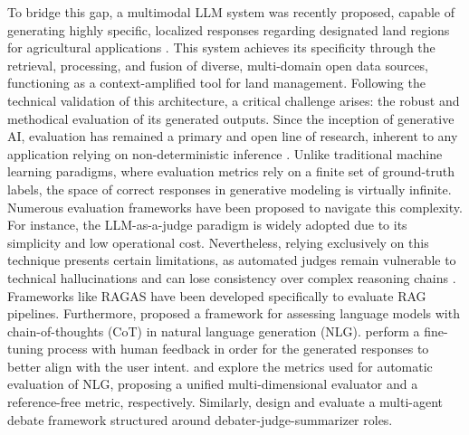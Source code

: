 \documentclass[preprint,review,12pt,authoryear]{elsarticle}
\begin{document}
To bridge this gap, a multimodal LLM system was recently proposed, capable of generating highly specific, localized responses regarding designated land regions for agricultural applications \citep{juan_2025}. This system achieves its specificity through the retrieval, processing, and fusion of diverse, multi-domain open data sources, functioning as a context-amplified tool for land management. Following the technical validation of this architecture, a critical challenge arises: the robust and methodical evaluation of its generated outputs. Since the inception of generative AI, evaluation has remained a primary and open line of research, inherent to any application relying on non-deterministic inference \citep{huang_survey_2024}. Unlike traditional machine learning paradigms, where evaluation metrics rely on a finite set of ground-truth labels, the space of correct responses in generative modeling is virtually infinite. Numerous evaluation frameworks have been proposed to navigate this complexity. For instance, the LLM-as-a-judge paradigm \citep{zheng_judging_2023} is widely adopted due to its simplicity and low operational cost. Nevertheless, relying exclusively on this technique presents certain limitations, as automated judges remain vulnerable to technical hallucinations and can lose consistency over complex reasoning chains \citep{yamauchi_empirical_2026}. Frameworks like RAGAS \citep{es_ragas_2025} have been developed specifically to evaluate RAG pipelines. Furthermore, \citet{liu_g-eval_2023} proposed a framework for assessing language models with chain-of-thoughts (CoT) in natural language generation (NLG). \citet{ouyang_training_nodate} perform a fine-tuning process with human feedback in order for the generated responses to better align with the user intent. \citet{zhong_towards_2022} and \citet{mehri_usr_2020} explore the metrics used for automatic evaluation of NLG, proposing a unified multi-dimensional evaluator and a reference-free metric, respectively. Similarly, \citet{wang_learning_2025} design and evaluate a multi-agent debate framework structured around debater-judge-summarizer roles.
\end{document}
